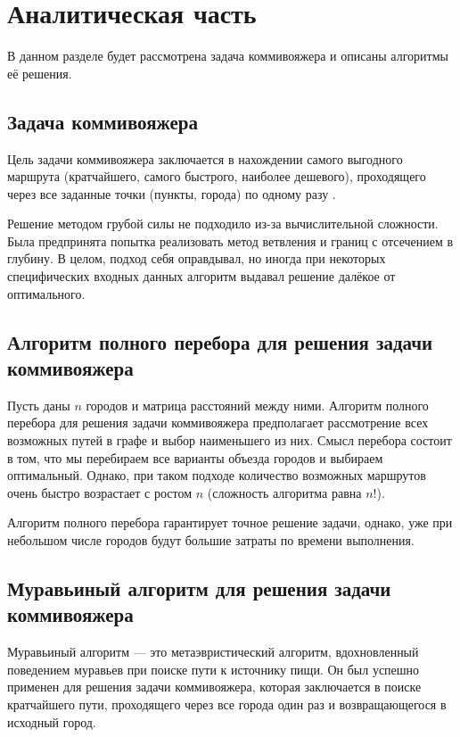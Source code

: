 \chapter{Аналитическая часть}
В данном разделе будет рассмотрена задача коммивояжера и описаны алгоритмы её решения.

\section{Задача коммивояжера}

Цель задачи коммивояжера заключается в нахождении самого выгодного маршрута (кратчайшего, самого быстрого, наиболее дешевого), проходящего через все заданные точки (пункты, города) по одному разу \cite{model}.

Решение методом грубой силы не подходило из-за вычислительной сложности. Была предпринята попытка реализовать метод ветвления и границ с отсечением в глубину. В целом, подход себя оправдывал, но иногда при некоторых специфических входных данных алгоритм выдавал решение далёкое от оптимального.

\section{Алгоритм полного перебора для решения задачи коммивояжера}

Пусть даны $n$ городов и матрица расстояний между ними.
Алгоритм полного перебора для решения задачи коммивояжера предполагает рассмотрение всех возможных путей в графе и выбор наименьшего из них.
Смысл перебора состоит в том, что мы перебираем все варианты объезда городов и выбираем оптимальный.
Однако, при таком подходе количество возможных маршрутов очень быстро возрастает с ростом $n$ (сложность алгоритма равна $n!$).

Алгоритм полного перебора гарантирует точное решение задачи, однако, уже при небольшом числе городов будут большие затраты по времени выполнения.

\section{Муравьиный алгоритм для решения задачи коммивояжера}

Муравьиный алгоритм --- это метаэвристический алгоритм, вдохновленный поведением муравьев при поиске пути к источнику пищи.
Он был успешно применен для решения задачи коммивояжера, которая заключается в поиске кратчайшего пути, проходящего через все города один раз и возвращающегося в исходный город.

